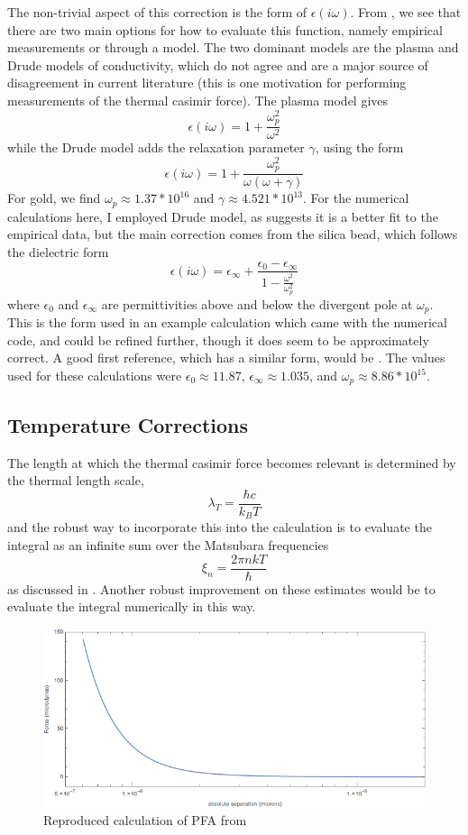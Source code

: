 \documentclass[11pt,traditabstract]{article}
\begin{document}
The non-trivial aspect of this correction is the form of $\epsilon(i\omega)$. From \citet{Lambrecht}, we see that there are two main options for how to evaluate this function, namely empirical measurements or through a model. The two dominant models are the plasma and Drude models of conductivity, which do not agree and are a major source of disagreement in current literature (this is one motivation for performing measurements of the thermal casimir force). The plasma model gives
$$
\epsilon(i\omega)=1+\frac{\omega_p^2}{\omega^2}
$$
while the Drude model adds the relaxation parameter $\gamma$, using the form
$$
\epsilon(i\omega)=1+\frac{\omega_p^2}{\omega(\omega+\gamma)}
$$
For gold, we find $\omega_p\approx1.37*10^{16}$ and $\gamma\approx4.521*10^{13}$. For the numerical calculations here, I employed Drude model, as \citet{Lambrecht} suggests it is a better fit to the empirical data, but the main correction comes from the silica bead, which follows the dielectric form
$$
\epsilon(i\omega)=\epsilon_{\infty} + \frac{\epsilon_{0} - \epsilon_{\infty}}{1 - \frac{\omega^2}{\omega_p^2}}
$$
where $\epsilon_0$ and $\epsilon_\infty$ are permittivities above and below the divergent pole at $\omega_p$. This is the form used in an example calculation which came with the numerical code, and could be refined further, though it does seem to be approximately correct. A good first reference, which has a similar form, would be \citet{Silica}. The values used for these calculations were $\epsilon_0\approx 11.87$, $\epsilon_\infty\approx1.035$, and $\omega_p\approx 8.86*10^{15}$. 

\subsection{Temperature Corrections}

The length at which the thermal casimir force becomes relevant is determined by the thermal length scale,
$$
\lambda_T=\frac{\hbar c}{k_B T}
$$
and the robust way to incorporate this into the calculation is to evaluate the integral as an infinite sum over the Matsubara frequencies
$$
\xi_n=\frac{2\pi n k T}{\hbar}
$$
as discussed in \citet{Durand}. Another robust improvement on these estimates would be to evaluate the integral numerically in this way.

\begin{figure}[h]
\centering
\includegraphics[width=5in]{LamPFA}
\caption{Reproduced calculation of PFA from \citet{Lamoreaux}}\label{fig:LamPFA}
\end{figure}
\end{document}
